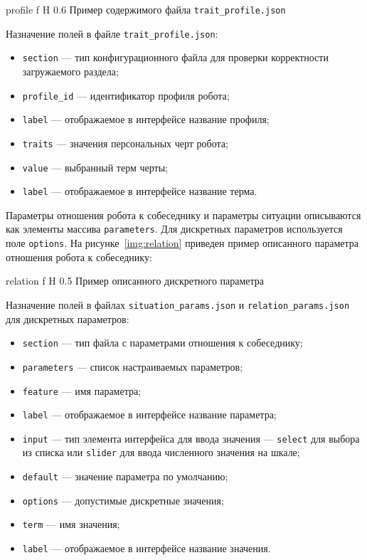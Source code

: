 {profile}
{f}
{H}
{0.6\textwidth}
{Пример содержимого файла \texttt{trait\_profile.json}}


Назначение полей в файле \texttt{trait\_profile.json}:
\begin{itemize}
	\item \texttt{section} --- тип конфигурационного файла для проверки
	корректности загружаемого раздела;
	\item \texttt{profile\_id} --- идентификатор профиля робота;
	\item \texttt{label} --- отображаемое в интерфейсе название профиля;
	\item \texttt{traits} --- значения персональных черт робота;
	\item \texttt{value} --- выбранный терм черты;
	\item \texttt{label} --- отображаемое в интерфейсе название терма.
\end{itemize}

Параметры отношения робота к собеседнику и параметры ситуации описываются как элементы массива \texttt{parameters}.
Для дискретных параметров используется поле \texttt{options}.
На рисунке~\ref{img:relation} приведен пример описанного параметра отношения робота к собеседнику:

{relation}
{f}
{H}
{0.5\textwidth}
{Пример описанного дискретного параметра}

Назначение полей в файлах \texttt{situation\_params.json} и \texttt{relation\_params.json} для дискретных параметров:
\begin{itemize}
	\item \texttt{section} --- тип файла с параметрами отношения к собеседнику;
	\item \texttt{parameters} --- список настраиваемых параметров;
	\item \texttt{feature} --- имя параметра;
	\item \texttt{label} --- отображаемое в интерфейсе название параметра;
	\item \texttt{input} --- тип элемента интерфейса для ввода значения ---
	\texttt{select} для выбора из списка или \texttt{slider} для ввода
	численного значения на шкале;
	\item \texttt{default} --- значение параметра по умолчанию;
	\item \texttt{options} --- допустимые дискретные значения;
	\item \texttt{term} --- имя значения;
	\item \texttt{label} --- отображаемое в интерфейсе название значения.
\end{itemize}


